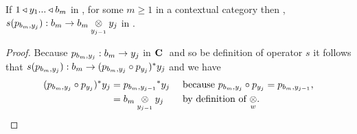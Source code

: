 \begin{lemma}
If $1 \base y_1 ... \base b_m$ in \catc, for some $m \ge 1$ in a contextual category \catcw then \foreachj,
$s(p_{b_m,y_j}): b_m \morph \crossx{b_m}{y_j}{y_{j-1}}$ in \catcw.
\end{lemma}
\begin{proof}
Because $p_{b_m,y_j}: b_m \morph y_j$ in $\catcw$ and so be definition of operator $s$ it follows that $s(p_{b_m,y_j}): b_m  \morph (p_{b_m,y_j} \circ p_{y_j})^*y_j$
and we have 
\begin{align*}
(p_{b_m,y_j} \circ p_{y_j})^*y_j &= {p_{b_m,y_{j-1}}} ^*y_j  && \mbox{ because $p_{b_m,y_j} \circ p_{y_j}=p_{b_m,y_{j-1}}$,} \\
                                 &= \crossx{b_m}{y_j}{y_{j-1}} && \mbox{ by definition of $\crossx{}{}{w}$}.
\end{align*}
\end{proof}

\newcommand{\ynyi}{\crossx{y_n}{y_i}{y_{i-1}}}
\newcommand{\yiyi}{\crossx{y_i}{y_i}{y_{i-1}}}
\newcommand{\fipxstarget}{\fipvectorstar(\crossx{x}{(\ynyi)}{1})}
\newcommand{\fipxspred}{\fipvectorstar(\crossx{x}{y_n}{1})}
\newcommand{\fitarget}{\fipvectorstar(\crossx{x}{y_i}{1})}

